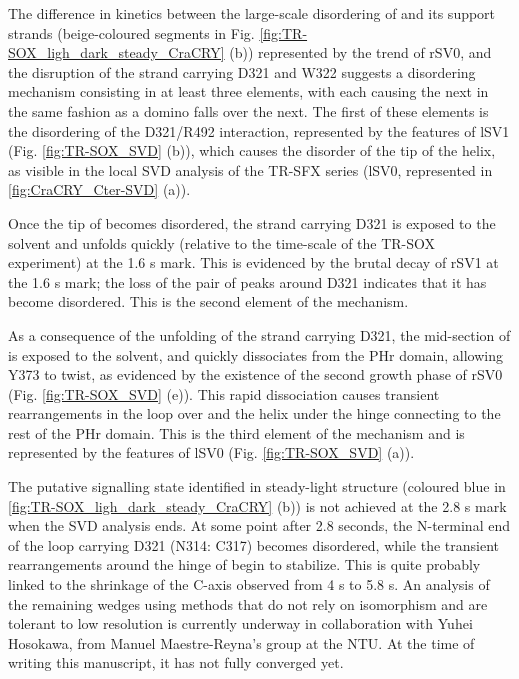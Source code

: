 The difference in kinetics between the large-scale disordering of  and its support strands (beige-coloured segments in Fig. \ref{fig:TR-SOX_ligh_dark_steady_CraCRY} (b)) represented by the trend of rSV0, and the disruption of the strand carrying D321 and W322 suggests a disordering mechanism consisting in at least three elements, with each causing the next in the same fashion as a domino falls over the next. The first of these elements is the disordering of the D321/R492 interaction, represented by the features of lSV1 (Fig. \ref{fig:TR-SOX_SVD} (b)), which causes the disorder of the tip of the  helix, as visible in the local SVD analysis of the TR-SFX series (lSV0, represented in \ref{fig:CraCRY_Cter-SVD} (a)). 

Once the tip of  becomes disordered, the strand carrying D321 is exposed to the solvent and unfolds quickly (relative to the time-scale of the TR-SOX experiment) at the 1.6 s mark. This is evidenced by the brutal decay of rSV1 at the 1.6 s mark; the loss of the pair of peaks around D321 indicates that it has become disordered. This is the second element of the mechanism. 

As a consequence of the unfolding of the strand carrying D321, the mid-section of  is exposed to the solvent, and quickly dissociates from the PHr domain, allowing Y373 to twist, as evidenced by the existence of the second growth phase of rSV0 (Fig. \ref{fig:TR-SOX_SVD} (e)). This rapid dissociation causes transient rearrangements in the loop over and the helix under the hinge connecting  to the rest of the PHr domain. This is the third element of the mechanism and is represented by the features of lSV0 (Fig. \ref{fig:TR-SOX_SVD} (a)). 

The putative signalling state identified in steady-light structure (coloured blue in \ref{fig:TR-SOX_ligh_dark_steady_CraCRY} (b)) is not achieved at the 2.8 s mark when the SVD analysis ends. At some point after 2.8 seconds, the N-terminal end of the loop carrying D321 (N314: C317) becomes disordered, while the transient rearrangements around the hinge of  begin to stabilize. This is quite probably linked to the shrinkage of the C-axis observed from 4 s to 5.8 s. An analysis of the remaining wedges using methods that do not rely on isomorphism and are tolerant to low resolution is currently underway in collaboration with Yuhei Hosokawa, from Manuel Maestre-Reyna's group at the NTU. At the time of writing this manuscript, it has not fully converged yet. 

